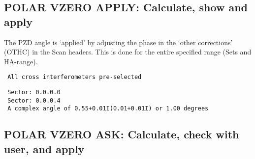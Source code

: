 \subsection{POLAR VZERO APPLY: Calculate, show and apply}
\label{.vzero.apply}

The PZD angle is `applied' by adjusting the phase in the `other corrections'
(OTHC) in the Scan headers. This is done for the entire specified range (Sets
and HA-range).

\spbegin %
\spend %
%
\spbegin %
\spend %
%
\spbegin %
\suser{\scr}
\spend %
%
\spbegin %
\spend %
%
\spbegin %
\sdefault{= *:}
\suser{\scr} %
\svbegin \begin{verbatim}
 All cross interferometers pre-selected
\end{verbatim}\svend
\spend %
%
\spbegin %
\suser{\scr} %
\svbegin \begin{verbatim}
 Sector: 0.0.0.0
 Sector: 0.0.0.4
 A complex angle of 0.55+0.01I(0.01+0.01I) or 1.00 degrees
\end{verbatim}\svend
\spend %

\subsection{POLAR VZERO ASK: Calculate, check with user, and apply}
\label{.vzero.ask}

